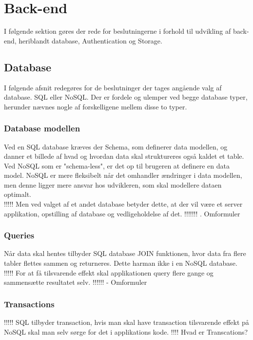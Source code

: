 \section{Back-end}
I følgende sektion gøres der rede for beslutningerne i forhold til udvikling af back-end, heriblandt database, Authentication og Storage.

\subsection{Database}
I følgende afsnit redegøres for de beslutninger der tages angående valg af database. SQL eller NoSQL.
Der er fordele og ulemper ved begge database typer, herunder nævnes nogle af forskelligene mellem disse to typer.

\subsubsection{Database modellen}
Ved en SQL database kræves der Schema, som definerer data modellen, og danner et billede af hvad og hvordan data skal struktureres også kaldet et table. Ved NoSQL som er "schema-less", er det op til brugeren at definere en data model. NoSQL er mere fleksibelt når det omhandler ændringer i data modellen, men denne ligger mere ansvar hos udvikleren, som skal modellere dataen optimalt. \\
!!!!! Men ved valget af et andet database betyder dette, at der vil være et server applikation, opstilling af database og vedligeholdelse af det. !!!!!!! . Omformuler

\subsubsection{Queries}
Når data skal hentes tilbyder SQL database JOIN funktionen, hvor data fra flere tabler flettes sammen og returneres. Dette harman ikke i en NoSQL database. \\
!!!!! For at få tilsvarende effekt skal applikationen query flere gange og sammensætte resultatet selv.  !!!!!! - Omformuler

\subsubsection{Transactions}
 !!!!! SQL tilbyder transaction, hvis man skal have transaction tilsvarende effekt på NoSQL skal man selv sørge for det i applikations kode. !!!! Hvad er Transcations?
 
